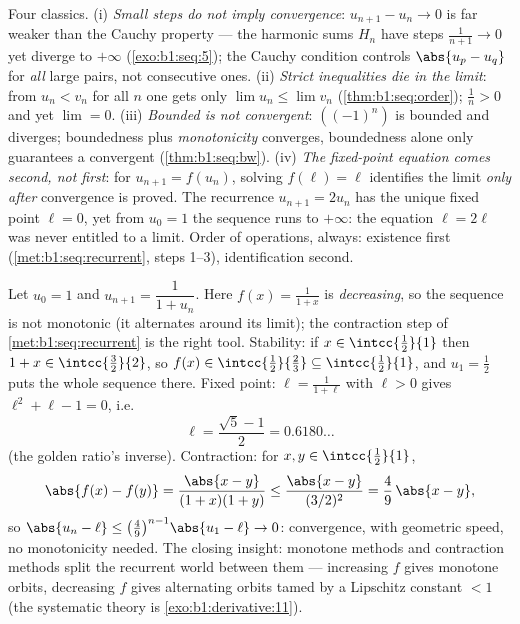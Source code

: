 \begin{remark}
Four classics. (i) \emph{Small steps do not imply convergence}:
$u_{n+1} - u_n \to 0$ is far weaker than the Cauchy property ---
the harmonic sums $H_n$ have steps $\frac{1}{n+1} \to 0$ yet
diverge to $+\infty$ (\cref{exo:b1:seq:5}); the Cauchy condition
controls $\abs{u_p - u_q}$ for \emph{all} large pairs, not
consecutive ones. (ii) \emph{Strict inequalities die in the
limit}: from $u_n < v_n$ for all $n$ one gets only $\lim u_n
\leq \lim v_n$ (\cref{thm:b1:seq:order}); $\frac1n > 0$ and yet
$\lim = 0$. (iii) \emph{Bounded is not convergent}: $((-1)^n)$
is bounded and diverges; boundedness plus \emph{monotonicity}
converges, boundedness alone only guarantees a convergent
 (\cref{thm:b1:seq:bw}). (iv) \emph{The fixed-point
equation comes second, not first}: for $u_{n+1} = f(u_n)$,
solving $f(\ell) = \ell$ identifies the limit \emph{only after}
convergence is proved. The recurrence $u_{n+1} = 2u_n$ has the
unique fixed point $\ell = 0$, yet from $u_0 = 1$ the sequence
runs to $+\infty$: the equation $\ell = 2\ell$ was never
entitled to a limit. Order of operations, always: existence
first (\cref{met:b1:seq:recurrent}, steps 1--3), identification
second.
\end{remark}

\begin{example}\label{ex:b1:seq:golden}
Let $u_0 = 1$ and $u_{n+1} = \dfrac{1}{1 + u_n}$. Here $f(x) =
\frac{1}{1+x}$ is \emph{decreasing}, so the sequence is not
monotonic (it alternates around its limit); the contraction step
of \cref{met:b1:seq:recurrent} is the right tool. Stability: if
$x \in \intcc{\frac12}{1}$ then $1 + x \in
\intcc{\frac32}{2}$, so $f(x) \in \intcc{\frac12}{\frac23}
\subseteq \intcc{\frac12}{1}$, and $u_1 = \frac12$ puts the
whole sequence there. Fixed point: $\ell = \frac{1}{1+\ell}$
with $\ell > 0$ gives $\ell^2 + \ell - 1 = 0$, i.e.
\[
\ell = \frac{\sqrt5 - 1}{2} = 0.6180\dots
\]
(the golden ratio's inverse). Contraction: for $x, y \in
\intcc{\frac12}{1}$,
\[
\abs{f(x) - f(y)} = \frac{\abs{x - y}}{(1+x)(1+y)}
\leq \frac{\abs{x-y}}{(3/2)^2} = \frac49\,\abs{x - y} ,
\]
so $\abs{u_n - \ell} \leq \bigl(\frac49\bigr)^{n-1}\abs{u_1 -
\ell} \to 0$: convergence, with geometric speed, no
monotonicity needed. The closing insight: monotone methods and
contraction methods split the recurrent world between them ---
increasing $f$ gives monotone orbits, decreasing $f$ gives
alternating orbits tamed by a Lipschitz constant $< 1$ (the
systematic theory is \cref{exo:b1:derivative:11}).
\end{example}

